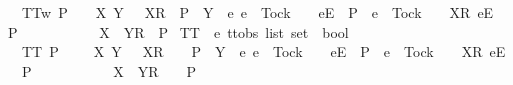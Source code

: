 \begin{isabellebody}
\ \ {\isachardoublequoteopen}TT{}w\ P\ {\isacharequal}\ {\isacharparenleft}{\isasymforall}\ {\isasymrho}\ X\ Y{\isachardot}\ {\isacharparenleft}{\isasymrho}\ {\isacharat}\ {\isacharbrackleft}{\isacharbrackleft}X{\isacharbrackright}\isactrlsub R{\isacharbrackright}\ {\isasymin}\ P\ {\isasymand}\ {\isacharparenleft}Y\ {\isasyminter}\ {\isacharbraceleft}e{\isachardot}\ {\isacharparenleft}e\ {\isasymnoteq}\ Tock\ {\isasymand}\ {\isasymrho}\ {\isacharat}\ {\isacharbrackleft}{\isacharbrackleft}e{\isacharbrackright}\isactrlsub E{\isacharbrackright}\ {\isasymin}\ P{\isacharparenright}\ {\isasymor}\ {\isacharparenleft}e\ {\isacharequal}\ Tock\ {\isasymand}\ {\isasymrho}\ {\isacharat}\ {\isacharbrackleft}{\isacharbrackleft}X{\isacharbrackright}\isactrlsub R{\isacharcomma}\ {\isacharbrackleft}e{\isacharbrackright}\isactrlsub E{\isacharbrackright}\ {\isasymin}\ P{\isacharparenright}\ {\isacharbraceright}\ {\isacharequal}\ {\isacharbraceleft}{\isacharbraceright}{\isacharparenright}{\isacharparenright}\isanewline
\ \ \ \ \ {\isasymlongrightarrow}\ {\isasymrho}\ {\isacharat}\ {\isacharbrackleft}{\isacharbrackleft}X\ {\isasymunion}\ Y{\isacharbrackright}\isactrlsub R{\isacharbrackright}\ {\isasymin}\ P{\isacharparenright}{\isachardoublequoteclose}\isanewline
\isanewline
{}\isamarkupfalse%
\ TT{}\ {\isacharcolon}{\isacharcolon}\ {\isachardoublequoteopen}{\isacharprime}e\ ttobs\ list\ set\ {\isasymRightarrow}\ bool{\isachardoublequoteclose}\ \isanewline
\ \ {\isachardoublequoteopen}TT{}\ P\ {\isacharequal}\ {\isacharparenleft}{\isasymforall}\ {\isasymrho}\ {\isasymsigma}\ X\ Y{\isachardot}\ {\isacharparenleft}{\isasymrho}\ {\isacharat}\ {\isacharbrackleft}{\isacharbrackleft}X{\isacharbrackright}\isactrlsub R{\isacharbrackright}\ {\isacharat}\ {\isasymsigma}\ {\isasymin}\ P\ {\isasymand}\ {\isacharparenleft}Y\ {\isasyminter}\ {\isacharbraceleft}e{\isachardot}\ {\isacharparenleft}e\ {\isasymnoteq}\ Tock\ {\isasymand}\ {\isasymrho}\ {\isacharat}\ {\isacharbrackleft}{\isacharbrackleft}e{\isacharbrackright}\isactrlsub E{\isacharbrackright}\ {\isasymin}\ P{\isacharparenright}\ {\isasymor}\ {\isacharparenleft}e\ {\isacharequal}\ Tock\ {\isasymand}\ {\isasymrho}\ {\isacharat}\ {\isacharbrackleft}{\isacharbrackleft}X{\isacharbrackright}\isactrlsub R{\isacharcomma}\ {\isacharbrackleft}e{\isacharbrackright}\isactrlsub E{\isacharbrackright}\ {\isasymin}\ P{\isacharparenright}\ {\isacharbraceright}\ {\isacharequal}\ {\isacharbraceleft}{\isacharbraceright}{\isacharparenright}{\isacharparenright}\isanewline
\ \ \ \ \ {\isasymlongrightarrow}\ {\isasymrho}\ {\isacharat}\ {\isacharbrackleft}{\isacharbrackleft}X\ {\isasymunion}\ Y{\isacharbrackright}\isactrlsub R{\isacharbrackright}\ {\isacharat}\ {\isasymsigma}\ {\isasymin}\ P{\isacharparenright}{\isachardoublequoteclose}\isanewline

\end{isabellebody}
